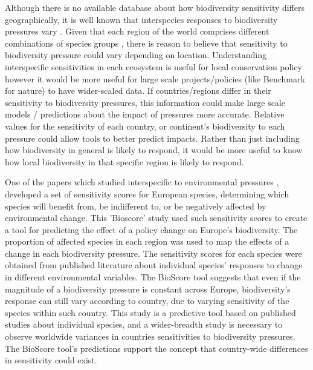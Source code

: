 \documentclass[11pt, a4paper, titlepage]{article}
\begin{document}
   	 Although there is no available database about how biodiversity sensitivity differs geographically, it is well known that interspecies responses to biodiversity pressures vary \citep{foden2013identifying}. Given that each region of the world comprises different combinations of species groups \citep{goethem2021biodiversity}, there is reason to believe that sensitivity to biodiversity pressure could vary depending on location. Understanding interspecific sensitivities in each ecosystem is useful for local conservation policy however it would be more useful for large scale projects/policies (like Benchmark for nature) to have wider-scaled data. If countries/regions differ in their sensitivity to biodiversity pressures, this information could make large scale models / predictions about the impact of pressures more accurate. Relative values for the sensitivity of each country, or continent's biodiversity to each pressure could allow tools to better predict impacts. Rather than just including how biodiversity in general is likely to respond, it would be more useful to know how local biodiversity in that specific region is likely to respond. \newline
   	 
	One of the papers which studied interspecific to environmental pressures \citep{louette2010bioscore}, developed a set of sensitivity scores for European species, determining which species will benefit from, be indifferent to, or be negatively affected by environmental change. This 'Bioscore' study used such sensitivity scores to create a tool for predicting the effect of a policy change on Europe's biodiversity. The proportion of affected species in each region was used to map the effects of a change in each biodiversity pressure. The sensitivity scores for each species were obtained from published literature about individual species' responses to change in different environmental variables. The BioScore tool suggests that even if the magnitude of a biodiversity pressure is constant across Europe, biodiversity's response can still vary according to country, due to varying sensitivity of the species within such country. This study is a predictive tool based on published studies about individual species, and a wider-breadth study is necessary to observe worldwide variances in countries sensitivities to biodiversity pressures. The BioScore tool's predictions support the concept that country-wide differences in sensitivity could exist. \newline
   	 
\end{document}
